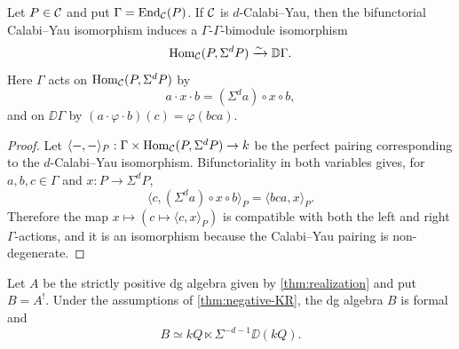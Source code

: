 \documentclass[11pt,a4paper,dvipsnames,x11names]{amsart}
\begin{document}
\begin{lem}\label{lem:CY-bimodule}
Let $P\in\mathcal C$ and put $\Gamma=\operatorname{End}_\mathcal C(P)$. If $\mathcal C$ is $d$-Calabi--Yau, then the bifunctorial Calabi--Yau isomorphism induces a $\Gamma$-$\Gamma$-bimodule isomorphism
\[
\operatorname{Hom}_\mathcal C(P,\Sigma^dP)\xrightarrow{\sim}\mathbb D\Gamma.
\]
Here $\Gamma$ acts on $\operatorname{Hom}_\mathcal C(P,\Sigma^dP)$ by
\[
a\cdot x\cdot b=(\Sigma^da)\circ x\circ b,
\]
and on $\DD\Gamma$ by $(a\cdot\varphi\cdot b)(c)=\varphi(bca)$.
\end{lem}

\begin{proof}
Let $\langle-,-\rangle_P:\Gamma\times\operatorname{Hom}_\mathcal C(P,\Sigma^dP)\to k$ be the perfect pairing corresponding to the $d$-Calabi--Yau isomorphism. Bifunctoriality in both variables gives, for $a,b,c\in\Gamma$ and $x:P\to\Sigma^dP$,
\[
\langle c,(\Sigma^da)\circ x\circ b\rangle_P
=\langle bca,x\rangle_P.
\]
Therefore the map $x\mapsto(c\mapsto\langle c,x\rangle_P)$ is compatible with both the left and right $\Gamma$-actions, and it is an isomorphism because the Calabi--Yau pairing is non-degenerate.
\end{proof}

\begin{lem}\label{lem:KR-koszul-model}
    Let $A$ be the strictly positive dg algebra given by \cref{thm:realization} and put $B=A^!$. Under the assumptions of \cref{thm:negative-KR}, the dg algebra $B$ is formal and
    \[
        B\simeq kQ\ltimes \Sigma^{-d-1}\DD(kQ).
    \]
\end{lem}
\end{document}
